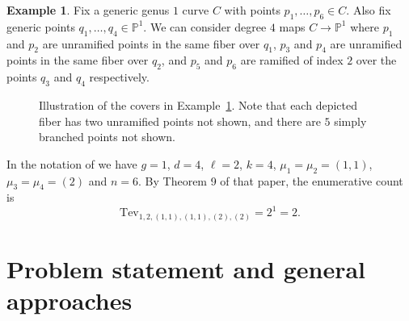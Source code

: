 \documentclass[thesis]{thesis-umich}           %
\renewcommand{\P}{\mathbb P}
\theoremstyle{definition}
\newtheorem{eg}[thm]{Example}
\begin{document}
\begin{eg}
  \label{eg:tevelev}
  Fix a generic genus $1$ curve $C$ with points $p_1,\dots,p_6\in C$. Also fix generic points
  $q_1,\dots,q_4\in\P^1$. We can consider degree $4$ maps $C\to\P^1$ where $p_1$ and $p_2$ are unramified points in the same fiber over $q_1$, $p_3$ and $p_4$ are unramified points in the same fiber over $q_2$, and $p_5$ and $p_6$ are ramified of index $2$ over the points $q_3$ and $q_4$ respectively.

  \begin{figure}[h]
  \caption{Illustration of the covers in Example~\ref{eg:tevelev}. Note that each depicted fiber has two unramified points not shown, and there are $5$ simply branched points not shown.}
  \centering
{}

\label{fig:tevelev}
\end{figure}

  In the notation of \cite{Generalized} we have $g=1$, $d=4$, $\ell=2$, $k=4$, $\mu_1=\mu_2=(1,1)$, $\mu_3=\mu_4=(2)$ and $n=6$. By Theorem 9 of that paper, the enumerative count is
  \[
  \text{Tev}_{1,2,(1,1),(1,1),(2),(2)}=2^1=2.
  \]
\end{eg}

\chapter{Problem statement and general approaches}
\end{document}
